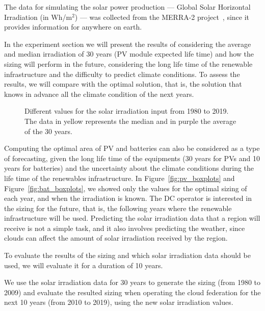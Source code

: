 
The data for simulating the solar power production --- Global Solar Horizontal Irradiation (in Wh/m$^{2}$) --- was collected from the MERRA-2 project~\cite{GELARO2017MERRA2}, since it provides information for anywhere on earth.


In the experiment section we will present the results of considering the average and median irradiation of 30 years (PV module expected life time) and how the sizing will perform in the future, considering the long life time of the renewable infrastructure and the difficulty to predict climate conditions. To assess the results, we will compare with the optimal solution, that is, the solution that knows in advance all the climate condition of the next years.

 \begin{figure}[!htbp]
  \centering
   {}
   \caption{Different values for the solar irradiation input from 1980 to 2019. The data in yellow represents the median and in purple the average of the 30 years. }
  \label{fig:pv_ghi}
\end{figure}




Computing the optimal area of PV and batteries can also be considered as a type of forecasting, given the long life time of the equipments (30 years for PVs and 10 years for batteries) and the uncertainty about the climate conditions during the life time of the renewables infrastructure. In Figure~\ref{fig:pv_boxplots} and Figure~\ref{fig:bat_boxplots}, we showed only the values for the optimal sizing of each year, and when the irradiation is known. The DC operator is interested in the sizing for the future, that is, the following years where the renewable infrastructure will be used. Predicting the solar irradiation data that a region will receive is not a simple task, and it also involves predicting the weather, since clouds can affect the amount of solar irradiation received by the region. 


To evaluate the results of the sizing and which solar irradiation data should be used, we will evaluate it for a duration of 10 years. 

We use the solar irradiation data for 30 years to generate the sizing (from 1980 to 2009) and evaluate the resulted sizing when operating the cloud federation for the next 10 years (from 2010 to 2019), using the new solar irradiation values.

